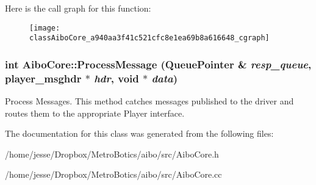 Here is the call graph for this function:\nopagebreak
\begin{figure}[H]
\begin{center}
\leavevmode
\texttt{[image: classAiboCore\_a940aa3f41c521cfc8e1ea69b8a616648\_cgraph]}
\end{center}
\end{figure}


\hypertarget{classAiboCore_a2612cdb01d22f3b18fa0c42ec15b4525}{
\subsubsection[{ProcessMessage}]{\setlength{\rightskip}{0pt plus 5cm}int AiboCore::ProcessMessage (QueuePointer \& {\em resp\_\-queue}, \/  player\_\-msghdr $\ast$ {\em hdr}, \/  void $\ast$ {\em data})}}
\label{classAiboCore_a2612cdb01d22f3b18fa0c42ec15b4525}
Process Messages. This method catches messages published to the driver and routes them to the appropriate Player interface. 

The documentation for this class was generated from the following files:\begin{DoxyCompactItemize}
\item 
/home/jesse/Dropbox/MetroBotics/aibo/src/AiboCore.h\item 
/home/jesse/Dropbox/MetroBotics/aibo/src/AiboCore.cc\end{DoxyCompactItemize}
